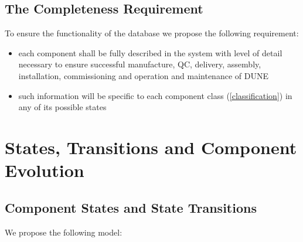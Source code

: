 \documentclass[pdftex,12pt,letter]{article}
\begin{document}
\subsection{The Completeness Requirement}

To ensure the functionality of the database we propose the following requirement:
\begin{itemize}
\item each component shall be fully described in the system with level of detail necessary to
ensure successful manufacture, QC, delivery, assembly, installation, commissioning
and operation and maintenance of DUNE

\item such information will be specific to each component class (\ref{classification}) in any of its possible states

\end{itemize}


\section{States, Transitions and Component Evolution}

\subsection{Component States and State Transitions}
\label{states}
We propose the following model:
\end{document}
